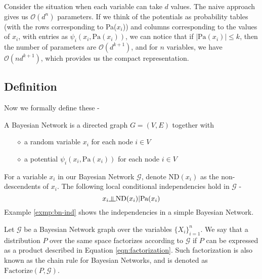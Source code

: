 Consider the situation when each variable can take $d$ values. The naive approach gives us $\mathcal{O}(d^n)$ parameters. If we think of the potentials as probability tables (with the rows corresponding to Pa($x_i$)) and columns corresponding to the values of $x_i$, with entries as $\psi_{i}(x_i, \text{Pa}(x_i))$, we can notice that if $|\text{Pa}(x_i)| \leq k$, then the number of parameters are $\mathcal{O}(d^{k+1})$, and for $n$ variables, we have $\mathcal{O}(nd^{k+1})$, which provides us the compact representation.
\subsection{Definition}
Now we formally define these -
\begin{defn}
A Bayesian Network is a directed graph $G = (V, E)$ together with 
\begin{itemize}[leftmargin=1cm]
	\item[$\diamond$] a random variable $x_i$ for each node $i \in V$
	\item[$\diamond$] a potential $\psi_i(x_i, \text{Pa}(x_i))$ for each node $i \in V$
\end{itemize}
\end{defn}
For a variable $x_i$ in our Bayesian Network $\mathcal G$, denote $\text{ND}(x_i)$ as the non-descendents of $x_i$. The following local conditional independencies hold in $\mathcal G$ - 
\begin{equation}
	x_i \ind \text{ND}(x_i) | \text{Pa}(x_i)
\end{equation}
Example \ref{exmp:bn-ind} shows the independencies in a simple Bayesian Network.
\begin{defn}[Factorization]	
Let $\mathcal{G}$ be a Bayesian Network graph over the variables $\{X_i\}_{i=1}^n$. We say that a distribution $P$ over the same space factorizes according to $\mathcal G$ if $P$ can be expressed as a product described in Equation \ref{eqn:factorization}. Such factorization is also known as the chain rule for Bayesian Networks, and is denoted as $\text{Factorize}(P, \mathcal G)$.
\end{defn}

